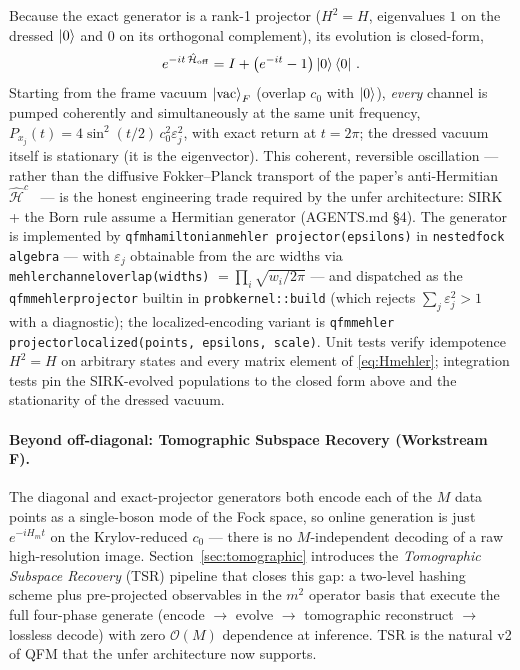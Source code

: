 \documentclass[11pt, a4paper]{article}
\newcommand{\Hgen}{\hat{\mathcal{H}}}
\begin{document}
Because the exact generator is a rank-1 projector ($H^2=H$, eigenvalues
$1$ on the dressed $\ket{0}$ and $0$ on its orthogonal complement), its
evolution is closed-form,
\begin{equation}
  e^{-it\,\Hgen_{\mathrm{off}}}
  =I+\bigl(e^{-it}-1\bigr)\ket{0}\bra{0}\,.
\end{equation}
Starting from the frame vacuum $\ket{\mathrm{vac}}_F$ (overlap $c_0$ with
$\ket{0}$), \emph{every} channel is pumped coherently and simultaneously at
the same unit frequency, $P_{x_j}(t)=4\sin^2(t/2)\,c_0^2\varepsilon_j^2$,
with exact return at $t=2\pi$; the dressed vacuum itself is stationary (it
is the eigenvector). This coherent, reversible oscillation --- rather than
the diffusive Fokker--Planck transport of the paper's anti-Hermitian
$\Hgen^c$~\cite{Layden2025} --- is the honest engineering trade required
by the unfer architecture: SIRK + the Born rule assume a Hermitian
generator (AGENTS.md \S4). The generator is implemented by
\texttt{qfm\textunderscore hamiltonian\textunderscore mehler\textunderscore
projector(epsilons)} in \texttt{nested\textunderscore fock\textunderscore
algebra} --- with $\varepsilon_j$ obtainable from the arc widths via
\texttt{mehler\textunderscore channel\textunderscore overlap(widths)}
$=\prod_i\sqrt{w_i/2\pi}$ --- and dispatched as the
\texttt{qfm\textunderscore mehler\textunderscore projector} builtin in
\texttt{prob\textunderscore kernel::build} (which rejects
$\sum_j\varepsilon_j^2>1$ with a diagnostic); the localized-encoding
variant is \texttt{qfm\textunderscore mehler\textunderscore
projector\textunderscore localized(points, epsilons, scale)}. Unit tests
verify idempotence $H^2=H$ on arbitrary states and every matrix element of
\eqref{eq:Hmehler}; integration tests pin the SIRK-evolved populations to
the closed form above and the stationarity of the dressed vacuum.

\paragraph{Beyond off-diagonal: Tomographic Subspace Recovery (Workstream F).}
The diagonal and exact-projector generators both encode each of the
$M$ data points as a single-boson mode of the Fock space, so online
generation is just $e^{-iH_m t}$ on the Krylov-reduced $c_0$ --- there is
no $M$-independent decoding of a raw high-resolution image. Section~\ref{sec:tomographic}
introduces the \emph{Tomographic Subspace Recovery} (TSR) pipeline that closes
this gap: a two-level hashing scheme plus pre-projected observables in the
$m^2$ operator basis that execute the full four-phase generate
(encode $\to$ evolve $\to$ tomographic reconstruct $\to$ lossless decode) with
zero $\mathcal{O}(M)$ dependence at inference. TSR is the natural v2 of QFM
that the unfer architecture now supports.
\end{document}
